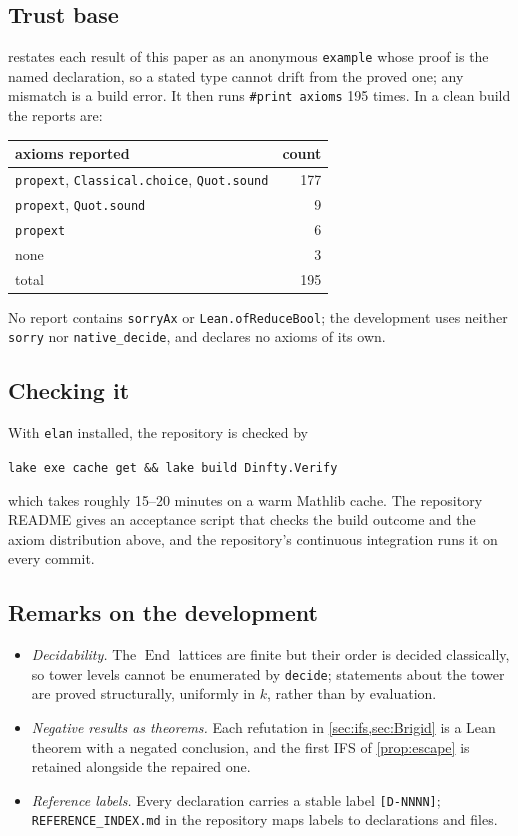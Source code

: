 \documentclass[11pt]{amsart}
\theoremstyle{plain}
\theoremstyle{definition}
\newcommand{\End}{\operatorname{End}}
\begin{document}
\subsection{Trust base}
 restates each result of this paper as an anonymous
\texttt{example} whose proof is the named declaration, so a stated type cannot
drift from the proved one; any mismatch is a build error. It then runs
\texttt{\#print axioms} 195 times. In a clean build the reports are:
\begin{center}
\begin{tabular}{lr}
\toprule
axioms reported & count\\
\midrule
\texttt{propext}, \texttt{Classical.choice}, \texttt{Quot.sound} & 177\\
\texttt{propext}, \texttt{Quot.sound} & 9\\
\texttt{propext} & 6\\
none & 3\\
\midrule
total & 195\\
\bottomrule
\end{tabular}
\end{center}
No report contains \texttt{sorryAx} or \texttt{Lean.ofReduceBool}; the
development uses neither \texttt{sorry} nor \texttt{native\_decide}, and
declares no axioms of its own.

\subsection{Checking it}
With \texttt{elan} installed, the repository is checked by
\begin{center}
\texttt{lake exe cache get \&\& lake build Dinfty.Verify}
\end{center}
which takes roughly 15--20 minutes on a warm Mathlib cache. The repository
README gives an acceptance script that checks the build outcome and the axiom
distribution above, and the repository's continuous integration runs it on
every commit.

\subsection{Remarks on the development}
\begin{itemize}[leftmargin=2em]
\item \emph{Decidability.} The $\End$ lattices are finite but their order is
  decided classically, so tower levels cannot be enumerated by \texttt{decide};
  statements about the tower are proved structurally, uniformly in $k$, rather
  than by evaluation.
\item \emph{Negative results as theorems.} Each refutation in
  \cref{sec:ifs,sec:Brigid} is a Lean theorem with a negated conclusion, and the
  first IFS of \cref{prop:escape} is retained alongside the repaired one.
\item \emph{Reference labels.} Every declaration carries a stable label
  \texttt{[D-NNNN]}; \texttt{REFERENCE\_INDEX.md} in the repository maps labels
  to declarations and files.
\end{itemize}
\end{document}
